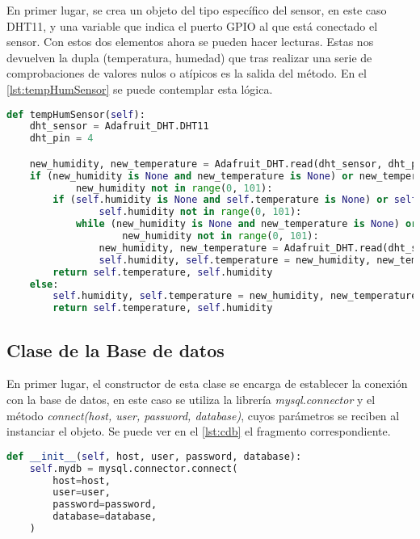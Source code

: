 En primer lugar, se crea un objeto del tipo específico del sensor, en este caso DHT11, y una variable que indica el puerto GPIO al que está conectado el sensor. Con estos dos elementos ahora se pueden hacer lecturas. Estas nos devuelven la dupla (temperatura, humedad) que tras realizar una serie de comprobaciones de valores nulos o atípicos es la salida del método. En el \autoref{lst:tempHumSensor} se puede contemplar esta lógica.
\begin{lstlisting}[language=Python, label=lst:tempHumSensor, caption=Lectura de la temperatura y humedad]
def tempHumSensor(self):
    dht_sensor = Adafruit_DHT.DHT11
    dht_pin = 4

    new_humidity, new_temperature = Adafruit_DHT.read(dht_sensor, dht_pin)
    if (new_humidity is None and new_temperature is None) or new_temperature not in range(0, 101) or \
            new_humidity not in range(0, 101):
        if (self.humidity is None and self.temperature is None) or self.temperature not in range(0, 101) or \
                self.humidity not in range(0, 101):
            while (new_humidity is None and new_temperature is None) or new_temperature not in range(0, 101) or \
                    new_humidity not in range(0, 101):
                new_humidity, new_temperature = Adafruit_DHT.read(dht_sensor, dht_pin)
                self.humidity, self.temperature = new_humidity, new_temperature
        return self.temperature, self.humidity
    else:
        self.humidity, self.temperature = new_humidity, new_temperature
        return self.temperature, self.humidity
\end{lstlisting}

\subsection{Clase de la Base de datos}\label{subsec:clase-de-la-base-de-datos}
En primer lugar, el constructor de esta clase se encarga de establecer la conexión con la base de datos, en este caso se utiliza la librería \textit{mysql.connector} y el método \textit{connect(host, user, password, database)}, cuyos parámetros se reciben al instanciar el objeto. Se puede ver en el \autoref{lst:cdb} el fragmento correspondiente.
\begin{lstlisting}[language=Python, label=lst:cdb, caption=Conexión con la base de datos]
def __init__(self, host, user, password, database):
    self.mydb = mysql.connector.connect(
        host=host,
        user=user,
        password=password,
        database=database,
    )
\end{lstlisting}

